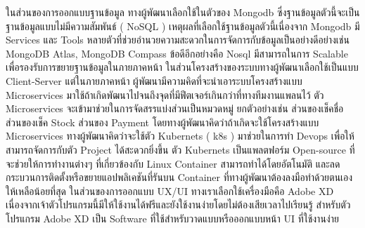 ในส่วนของการออกแบบฐานข้อมูล ทางผู้พัฒนาเลือกใช้ในตัวของ Mongodb \cite{MongoDB} ซึ่งฐานข้อมูลตัวนี้จะเป็นฐานข้อมูลแบบไม่มีความสัมพันธ์ ( NoSQL ) 
เหตุผลที่เลือกใช้ฐานข้อมูลตัวนี้เนื่องจาก Mongodb มี Services และ Tools หลายตัวที่ช่วยอำนวยความสะดวกในการจัดการกับข้อมูลเป็นอย่างดีอย่างเช่น MongoDB Atlas, MongoDB Compass 
ข้อดีอีกอย่างคือ Nosql มีสามารถในการ Scalable เพื่อรองรับการขยายฐานข้อมูลในภายภาคหน้า  ในส่วนโครงสร้างของระบบทางผู้พัฒนาเลือกใช้เป็นแบบ Client-Server \cite{Client-Server} แต่ในภายภาคหน้า  ผู้พัฒนามีความคิดที่จะนำเอาระบบโครงสร้างแบบ Microservices \cite{Microservice}มาใช้ถ้าเกิดพัฒนาไปจนถึงจุดที่มีฟีตเจอร์เกินกว่าที่ทางทีมงานแพลนไว้  
ตัว Microservices จะเข้ามาช่วยในการจัดสรรแบ่งส่วนเป็นหมวดหมู่  ยกตัวอย่างเช่น  ส่วนของเช็คชื่อ  ส่วนของเช็ค Stock  ส่วนของ Payment  โดยทางผู้พัฒนาคิดว่าถ้าเกิดจะใช้โครงสร้างแบบ Microservices ทางผู้พัฒนาคิดว่าจะใช้ตัว Kubernets ( k8s ) มาช่วยในการทำ Devops เพื่อให้สามารถจัดการกับตัว Project ได้สะดวกยิ่งขึ้น 
ตัว Kubernets เป็นแพลตฟอร์ม Open-source ที่จะช่วยให้การทำงานต่างๆ ที่เกี่ยวข้องกับ Linux Container สามารถทำได้โดยอัตโนมัติ และลดกระบวนการติดตั้งหรือขยายแอปพลิเคชันที่รันบน Container ที่ทางผู้พัฒนาต้องลงมือทำด้วยตนเองให้เหลือน้อยที่สุด 
	ในส่วนของการออกแบบ UX/UI ทางเราเลือกใช้เครื่องมือคือ Adobe XD \cite{AdobeXD} เนื่องจากเจ้าตัวโปรแกรมนี้มีให้ใช้งานได้ฟรีและยังใช้งานง่ายโดยไม่ต้องเสียเวลาไปเรียนรู้ สำหรับตัวโปรแกรม Adobe XD เป็น Software ที่ใช้สำหรับวาดแบบหรือออกแบบหน้า UI ที่ใช้งานง่าย 
  
  
  

